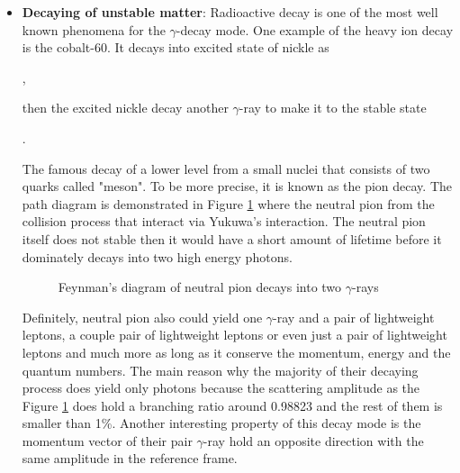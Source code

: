 \begin{itemize}
    \item \textbf{Decaying of unstable matter}:
    Radioactive decay is one of the most well known
    phenomena for the $\gamma$-decay mode. One example 
    of the heavy ion decay is the cobalt-60. It decays 
    into excited state of nickle as

    ,

    then the excited nickle decay another $\gamma$-ray
    to make it to the stable state

    .

    The famous decay of a lower level from a small 
    nuclei that consists of two quarks called "meson".
    To be more precise, it is known as the pion decay.
    The path diagram is demonstrated in Figure \ref{fig:neutral_pion_decay}
    where the neutral pion from the collision process that
    interact via Yukuwa's interaction. The neutral pion itself
    does not stable then it would have a short amount of lifetime 
    before it dominately decays into two high energy photons.
    \begin{figure}[h!]
        \centering
        
        \caption{Feynman's diagram of neutral pion decays into two $\gamma$-rays}
        \label{fig:neutral_pion_decay}
    \end{figure}
    Definitely, neutral pion also could yield one $\gamma$-ray
    and a pair of lightweight leptons, a couple 
    pair of lightweight leptons or even just a pair 
    of lightweight leptons and much more as long as it 
    conserve the momentum, energy and the quantum numbers.
    The main reason why the majority of their decaying process
    does yield only photons because the scattering amplitude
    as the Figure \ref{fig:neutral_pion_decay} does hold a branching
    ratio around 0.98823 and the rest of them is 
    smaller than 1\%. Another interesting property of this 
    decay mode is the momentum vector of their pair $\gamma$-ray
    hold an opposite direction with the same amplitude in the 
    reference frame.


\end{itemize}
